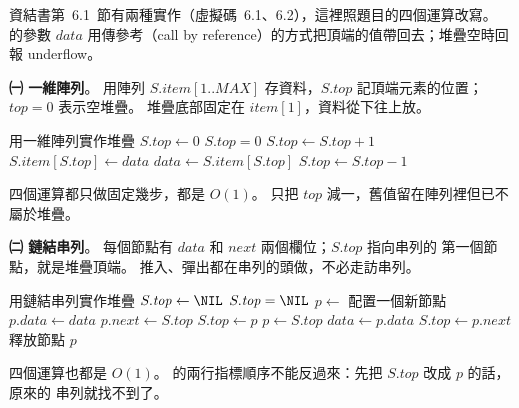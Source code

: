 \begin{pastsoln}
資結書第~6.1~節有兩種實作（虛擬碼~6.1、6.2），這裡照題目的四個運算改寫。  的參數
$\mathit{data}$ 用傳參考（call by reference）的方式把頂端的值帶回去；堆疊空時回報 underflow。

\textbf{㈠ 一維陣列}。 用陣列 $S.\mathit{item}[1..\mathit{MAX}]$ 存資料，$S.\mathit{top}$ 記頂端元素的位置；
$\mathit{top} = 0$ 表示空堆疊。 堆疊底部固定在 $\mathit{item}[1]$，資料從下往上放。
\begin{pseudo}{用一維陣列實作堆疊}
    \State $S.\mathit{top} \gets 0$ 
\EndProcedure
\Statex
{}
    \State \Return $S.\mathit{top} = 0$
\EndFunction
\Statex
{}
        \State {}
    \EndIf
    \State $S.\mathit{top} \gets S.\mathit{top} + 1$
    \State $S.\mathit{item}[S.\mathit{top}] \gets \mathit{data}$
\EndProcedure
\Statex
{} 
        \State {}
    \EndIf
    \State $\mathit{data} \gets S.\mathit{item}[S.\mathit{top}]$
    \State $S.\mathit{top} \gets S.\mathit{top} - 1$
\EndProcedure
\end{pseudo}
四個運算都只做固定幾步，都是 $O(1)$。  只把 $\mathit{top}$ 減一，舊值留在陣列裡但已不屬於堆疊。

\textbf{㈡ 鏈結串列}。 每個節點有 $\mathit{data}$ 和 $\mathit{next}$ 兩個欄位；$S.\mathit{top}$ 指向串列的
第一個節點，就是堆疊頂端。 推入、彈出都在串列的頭做，不必走訪串列。
\begin{pseudo}{用鏈結串列實作堆疊}
    \State $S.\mathit{top} \gets \NIL$
\EndProcedure
\Statex
{}
    \State \Return $S.\mathit{top} = \NIL$
\EndFunction
\Statex
{}
    \State $p \gets$ 配置一個新節點 
    \State $p.\mathit{data} \gets \mathit{data}$
    \State $p.\mathit{next} \gets S.\mathit{top}$ 
    \State $S.\mathit{top} \gets p$
\EndProcedure
\Statex
{} 
        \State {}
    \EndIf
    \State $p \gets S.\mathit{top}$
    \State $\mathit{data} \gets p.\mathit{data}$
    \State $S.\mathit{top} \gets p.\mathit{next}$
    \State 釋放節點 $p$
\EndProcedure
\end{pseudo}
四個運算也都是 $O(1)$。  的兩行指標順序不能反過來：先把 $S.\mathit{top}$ 改成 $p$ 的話，原來的
串列就找不到了。


\end{pastsoln}
